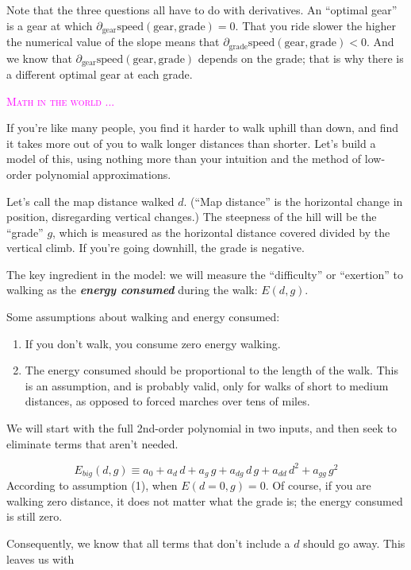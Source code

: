 \documentclass[
  letterpaper,
  DIV=11,
  numbers=noendperiod,
  oneside]{scrreprt}
\providecommand{\tightlist}{%
  \setlength{\itemsep}{0pt}\setlength{\parskip}{0pt}}
\newenvironment{intheworld}%
{%
\textcolor{magenta}{\hrulefill}%
  \par\vspace{.3\baselineskip}%
  \textcolor{magenta}{\scshape Math in the world ...}%
  \par\vspace{\baselineskip}%
}%
{\textcolor{magenta}{\hrulefill}}
\begin{document}
Note that the three questions all have to do with derivatives. An
``optimal gear'' is a gear at which
\(\partial_\text{gear} \text{speed}(\text{gear}, \text{grade}) = 0\).
That you ride slower the higher the numerical value of the slope means
that
\(\partial_\text{grade} \text{speed}(\text{gear}, \text{grade}) < 0\).
And we know that
\(\partial_\text{gear} \text{speed}(\text{gear}, \text{grade})\) depends
on the grade; that is why there is a different optimal gear at each
grade.

\begin{intheworld}
If you're like many people, you find it harder to walk uphill than down,
and find it takes more out of you to walk longer distances than shorter.
Let's build a model of this, using nothing more than your intuition and
the method of low-order polynomial approximations.

Let's call the map distance walked \(d\). (``Map distance'' is the
horizontal change in position, disregarding vertical changes.) The
steepness of the hill will be the ``grade'' \(g\), which is measured as
the horizontal distance covered divided by the vertical climb. If you're
going downhill, the grade is negative.

The key ingredient in the model: we will measure the ``difficulty'' or
``exertion'' to walking as the \textbf{\emph{energy consumed}} during
the walk: \(E(d, g)\).

Some assumptions about walking and energy consumed:

\begin{enumerate}
\def\labelenumi{\arabic{enumi}.}
\tightlist
\item
  If you don't walk, you consume zero energy walking.
\item
  The energy consumed should be proportional to the length of the walk.
  This is an assumption, and is probably valid, only for walks of short
  to medium distances, as opposed to forced marches over tens of miles.
\end{enumerate}

We will start with the full 2nd-order polynomial in two inputs, and then
seek to eliminate terms that aren't needed.

\[E_{big}(d, g) \equiv a_0 + a_d\, d + a_g\, g + a_{dg}\, d\, g + a_{dd}\,d^2 + a_{gg}\,g^2\]
According to assumption (1), when \(E(d=0, g) = 0\). Of course, if you
are walking zero distance, it does not matter what the grade is; the
energy consumed is still zero.

Consequently, we know that all terms that don't include a \(d\) should
go away. This leaves us with


\end{intheworld}
\end{document}
